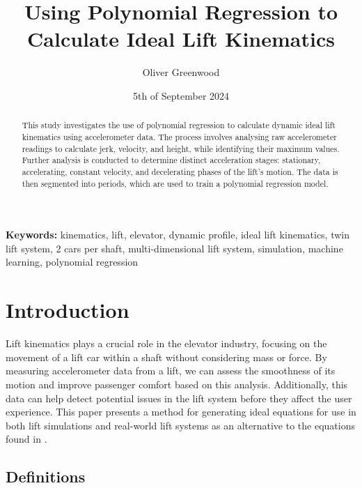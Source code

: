 \documentclass[12pt,a4paper]{article}
\title{Using Polynomial Regression to Calculate Ideal Lift Kinematics}
\author{Oliver Greenwood}
\affil{Peters' Research, Great Missenden UK}
\date{5th of September 2024}
\begin{document}
\maketitle

\begin{abstract}
   This study investigates the use of polynomial regression to calculate dynamic ideal lift kinematics using accelerometer data. The process involves analysing raw accelerometer readings to calculate jerk, velocity, and height, while identifying their maximum values. Further analysis is conducted to determine distinct acceleration stages: stationary, accelerating, constant velocity, and decelerating phases of the lift's motion. The data is then segmented into periods, which are used to train a polynomial regression model. 
\end{abstract}

\noindent\textbf{Keywords:} kinematics, lift, elevator, dynamic profile, ideal lift kinematics, twin lift system, 2 cars per shaft, multi-dimensional lift system, simulation, machine learning, polynomial regression

\section{Introduction}

Lift kinematics plays a crucial role in the elevator industry, focusing on the movement of a lift car within a shaft without considering mass or force. By measuring accelerometer data from a lift, we can assess the smoothness of its motion and improve passenger comfort based on this analysis. Additionally, this data can help detect potential issues in the lift system before they affect the user experience. This paper presents a method for generating ideal equations for use in both lift simulations and real-world lift systems as an alternative to the equations found in \cite{GenerationApplicationDynamicLiftKinematics}.

\subsection{Definitions}
\end{document}
